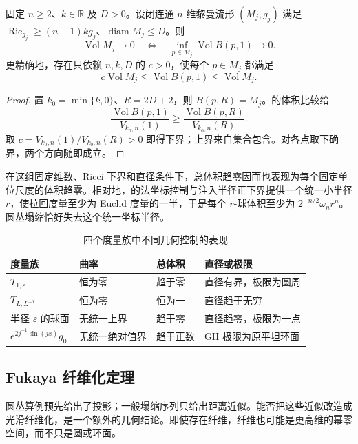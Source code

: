 \begin{proposition}\label{g3:prop:collapse-local-global-volume}
	固定 \(n\ge2\)、\(k\in\mathbb R\) 及 \(D>0\)。设闭连通 \(n\) 维黎曼流形 \((M_j,g_j)\) 满足 \(\operatorname{Ric}_{g_j}\ge(n-1)kg_j\)、\(\operatorname{diam}M_j\le D\)。则
	\[
		\operatorname{Vol}M_j\to0
		\quad\Longleftrightarrow\quad
		\inf_{p\in M_j}\operatorname{Vol}B(p,1)\to0.
	\]
	更精确地，存在只依赖 \(n,k,D\) 的 \(c>0\)，使每个 \(p\in M_j\) 都满足
	\[
		c\operatorname{Vol}M_j\le\operatorname{Vol}B(p,1)
		\le\operatorname{Vol}M_j.
	\]
\end{proposition}
\begin{proof}
	置 \(k_0=\min\{k,0\}\)、\(R=2D+2\)，则 \(B(p,R)=M_j\)。的体积比较给
	\[
		\frac{\operatorname{Vol}B(p,1)}{V_{k_0,n}(1)}
		\ge\frac{\operatorname{Vol}B(p,R)}{V_{k_0,n}(R)}.
	\]
	取 \(c=V_{k_0,n}(1)/V_{k_0,n}(R)>0\) 即得下界；上界来自集合包含。对各点取下确界，两个方向随即成立。
\end{proof}

在这组固定维数、Ricci 下界和直径条件下，总体积趋零因而也表现为每个固定单位尺度的体积趋零。相对地，的法坐标控制与注入半径正下界提供一个统一小半径 \(r\)，使拉回度量至少为 Euclid 度量的一半，于是每个 \(r\)-球体积至少为 \(2^{-n/2}\omega_nr^n\)。圆丛塌缩恰好失去这个统一坐标半径。

\begin{table}[htbp]
	\centering\small
	\caption{四个度量族中不同几何控制的表现}
	\label{g3:tab:collapse-controls}
	\begin{tabularx}{\textwidth}{@{}lXXX@{}}
		\toprule
		度量族 & 曲率 & 总体积 & 直径或极限\\
		\midrule
		\(T_{1,\varepsilon}\) & 恒为零 & 趋于零 & 直径有界，极限为圆周\\
		\(T_{L,L^{-1}}\) & 恒为零 & 恒为一 & 直径趋于无穷\\
		半径 \(\varepsilon\) 的球面 & 无统一上界 & 趋于零 & 直径趋零，极限为一点\\
		\(e^{2j^{-1}\sin(jx)}g_0\) & 无统一绝对值界 & 趋于正数 & GH 极限为原平坦环面\\
		\bottomrule
	\end{tabularx}
\end{table}

\subsection{Fukaya 纤维化定理}
\label{g3:subsec:2902:03}
圆丛算例预先给出了投影；一般塌缩序列只给出距离近似。能否把这些近似改造成光滑纤维化，是一个额外的几何结论。即使存在纤维，纤维也可能是更高维的幂零空间，而不只是圆或环面。

